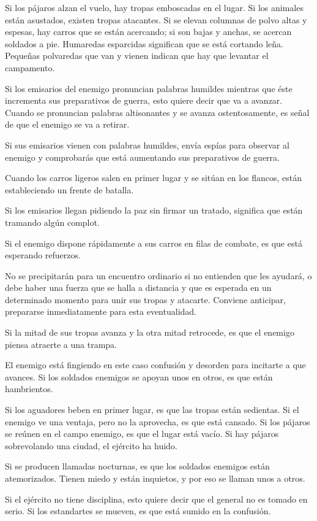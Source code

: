 Si los pájaros alzan el vuelo, hay tropas emboscadas en el lugar. Si los animales están asustados, existen tropas atacantes. Si se elevan columnas de polvo altas y espesas, hay carros que se están acercando; si son bajas y anchas, se acercan soldados a pie. Humaredas esparcidas significan que se está cortando leña. Pequeñas polvaredas que van y vienen indican que hay que levantar el campamento.

Si los emisarios del enemigo pronuncian palabras humildes mientras que éste incrementa sus preparativos de guerra, esto quiere decir que va a avanzar. Cuando se pronuncian palabras altisonantes y se avanza ostentosamente, es señal de que el enemigo se va a retirar.

Si sus emisarios vienen con palabras humildes, envía espías para observar al enemigo y comprobarás que está aumentando sus preparativos de guerra.

Cuando los carros ligeros salen en primer lugar y se sitúan en los flancos, están estableciendo un frente de batalla.

Si los emisarios llegan pidiendo la paz sin firmar un tratado, significa que están tramando algún complot.

Si el enemigo dispone rápidamente a sus carros en filas de combate, es que está esperando refuerzos.

No se precipitarán para un encuentro ordinario si no entienden que les ayudará, o debe haber una fuerza que se halla a distancia y que es esperada en un determinado momento para unir sus tropas y atacarte. Conviene anticipar, prepararse inmediatamente para esta eventualidad.

Si la mitad de sus tropas avanza y la otra mitad retrocede, es que el enemigo piensa atraerte a una trampa.

El enemigo está fingiendo en este caso confusión y desorden para incitarte a que avances. Si los soldados enemigos se apoyan unos en otros, es que están hambrientos.

Si los aguadores beben en primer lugar, es que las tropas están sedientas. Si el enemigo ve una ventaja, pero no la aprovecha, es que está cansado. Si los pájaros se reúnen en el campo enemigo, es que el lugar está vacío. Si hay pájaros sobrevolando una ciudad, el ejército ha huido.

Si se producen llamadas nocturnas, es que los soldados enemigos están atemorizados. Tienen miedo y están inquietos, y por eso se llaman unos a otros.

Si el ejército no tiene disciplina, esto quiere decir que el general no es tomado en serio. Si los estandartes se mueven, es que está sumido en la confusión.

